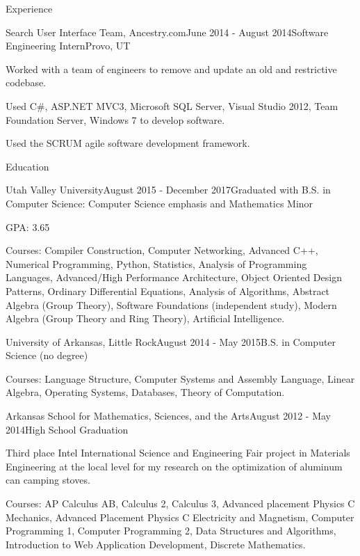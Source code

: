 \documentclass{resume} %
\begin{document}
\begin{rSection}{Experience}
  \begin{rSubsection}{Search User Interface Team, Ancestry.com}{June 2014 - August 2014}{Software Engineering Intern}{Provo, UT}
  \item Worked with a team of engineers to remove and update an old and restrictive codebase.
  \item Used C\#, ASP.NET MVC3, Microsoft SQL Server, Visual Studio 2012, Team Foundation Server, Windows 7 to develop software.
  \item Used the SCRUM agile software development framework.
  \end{rSubsection}

\end{rSection}


\begin{rSection}{Education}

  \begin{rSubsection}{Utah Valley University}{August 2015 - December 2017}{Graduated with B.S. in Computer Science: Computer Science emphasis and Mathematics Minor}
  \item GPA: 3.65
  \item Courses: Compiler Construction, Computer Networking, Advanced C++, Numerical Programming, Python, Statistics, Analysis of Programming Languages, Advanced/High Performance Architecture, Object Oriented Design Patterns, Ordinary Differential Equations, Analysis of Algorithms, Abstract Algebra (Group Theory), Software Foundations (independent study), Modern Algebra (Group Theory and Ring Theory), Artificial Intelligence.
  \end{rSubsection}
  
  \begin{rSubsection}{University of Arkansas, Little Rock}{August 2014 - May 2015}{B.S. in Computer Science (no degree)}
  \item Courses: Language Structure, Computer Systems and Assembly Language, Linear Algebra, Operating Systems, Databases, Theory of Computation.
  \end{rSubsection}

  \begin{rSubsection}{Arkansas School for Mathematics, Sciences, and the Arts}{August 2012 - May 2014}{High School Graduation}
  \item Third place Intel International Science and Engineering Fair project in Materials Engineering at the local level for my research on the optimization of aluminum can camping stoves.
  \item Courses: AP Calculus AB, Calculus 2, Calculus 3, Advanced placement Physics C Mechanics, Advanced Placement Physics C Electricity and Magnetism, Computer Programming 1, Computer Programming 2, Data Structures and Algorithms, Introduction to Web Application Development, Discrete Mathematics.
  \end{rSubsection}

\end{rSection}
\end{document}
